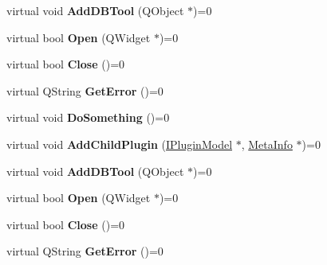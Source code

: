 \begin{DoxyCompactItemize}
\item 
virtual void {\bfseries Add\+D\+B\+Tool} (Q\+Object $\ast$)=0\hypertarget{class_i_plugin_model_a2db1262756c4a587fd6cd2d7191841fb}{}\label{class_i_plugin_model_a2db1262756c4a587fd6cd2d7191841fb}

\item 
virtual bool {\bfseries Open} (Q\+Widget $\ast$)=0\hypertarget{class_i_plugin_model_ac1c51202f69db707ca56e8f3c78ce163}{}\label{class_i_plugin_model_ac1c51202f69db707ca56e8f3c78ce163}

\item 
virtual bool {\bfseries Close} ()=0\hypertarget{class_i_plugin_model_a3f9ce2298f73283fec68fc908db14e57}{}\label{class_i_plugin_model_a3f9ce2298f73283fec68fc908db14e57}

\item 
virtual Q\+String {\bfseries Get\+Error} ()=0\hypertarget{class_i_plugin_model_ad42778c15ce3e8fdb9524a6dfd61792a}{}\label{class_i_plugin_model_ad42778c15ce3e8fdb9524a6dfd61792a}

\item 
virtual void {\bfseries Do\+Something} ()=0\hypertarget{class_i_plugin_model_a377627e683f892ffda2c6225d975251b}{}\label{class_i_plugin_model_a377627e683f892ffda2c6225d975251b}

\item 
virtual void {\bfseries Add\+Child\+Plugin} (\hyperlink{class_i_plugin_model}{I\+Plugin\+Model} $\ast$, \hyperlink{struct_meta_info}{Meta\+Info} $\ast$)=0\hypertarget{class_i_plugin_model_aff406b0571f6dc77488c315e0df0f563}{}\label{class_i_plugin_model_aff406b0571f6dc77488c315e0df0f563}

\item 
virtual void {\bfseries Add\+D\+B\+Tool} (Q\+Object $\ast$)=0\hypertarget{class_i_plugin_model_a2db1262756c4a587fd6cd2d7191841fb}{}\label{class_i_plugin_model_a2db1262756c4a587fd6cd2d7191841fb}

\item 
virtual bool {\bfseries Open} (Q\+Widget $\ast$)=0\hypertarget{class_i_plugin_model_ac1c51202f69db707ca56e8f3c78ce163}{}\label{class_i_plugin_model_ac1c51202f69db707ca56e8f3c78ce163}

\item 
virtual bool {\bfseries Close} ()=0\hypertarget{class_i_plugin_model_a3f9ce2298f73283fec68fc908db14e57}{}\label{class_i_plugin_model_a3f9ce2298f73283fec68fc908db14e57}

\item 
virtual Q\+String {\bfseries Get\+Error} ()=0\hypertarget{class_i_plugin_model_ad42778c15ce3e8fdb9524a6dfd61792a}{}\label{class_i_plugin_model_ad42778c15ce3e8fdb9524a6dfd61792a}


\end{DoxyCompactItemize}
